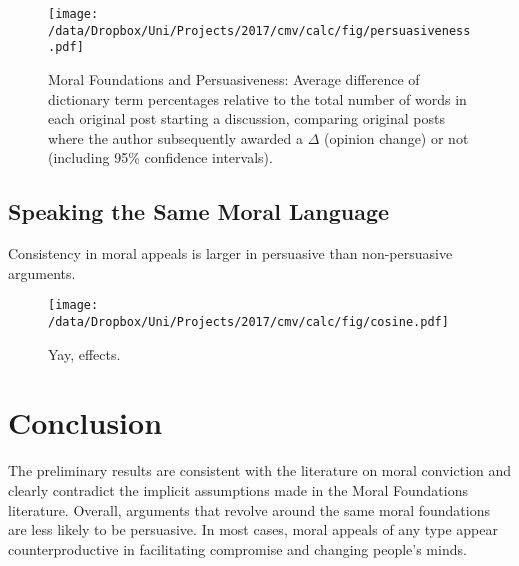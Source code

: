 \begin{figure}[ht]
\centering
\texttt{[image: /data/Dropbox/Uni/Projects/2017/cmv/calc/fig/persuasiveness.pdf]}
\caption[Moral Foundations and Persuasiveness]{Moral Foundations and Persuasiveness: Average difference of dictionary term percentages relative to the total number of words in each original post starting a discussion, comparing original posts where the author subsequently awarded a $\Delta$ (opinion change) or not (including 95\% confidence intervals).}
\end{figure}


\subsection{Speaking the Same Moral Language}

Consistency in moral appeals is larger in persuasive than non-persuasive arguments.

\begin{figure}[ht]
\centering
\texttt{[image: /data/Dropbox/Uni/Projects/2017/cmv/calc/fig/cosine.pdf]}
\caption{Yay, effects.}
\end{figure}



\section{Conclusion}\label{conclusion}

The preliminary results are consistent with the literature on moral conviction and clearly contradict the implicit assumptions made in the Moral Foundations literature. Overall, arguments that revolve around the same moral foundations are less likely to be persuasive. In most cases, moral appeals of any type appear counterproductive in facilitating compromise and changing people's minds.



